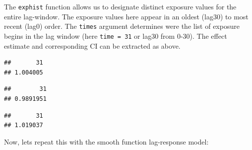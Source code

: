 \documentclass[
]{book}
\newenvironment{Shaded}{\begin{snugshade}}{\end{snugshade}}
\newcommand{\DataTypeTok}[1]{\textcolor[rgb]{0.13,0.29,0.53}{#1}}
\newcommand{\DecValTok}[1]{\textcolor[rgb]{0.00,0.00,0.81}{#1}}
\newcommand{\KeywordTok}[1]{\textcolor[rgb]{0.13,0.29,0.53}{\textbf{#1}}}
\newcommand{\NormalTok}[1]{#1}
\newcommand{\OperatorTok}[1]{\textcolor[rgb]{0.81,0.36,0.00}{\textbf{#1}}}
\begin{document}
The \texttt{exphist} function allows us to designate distinct exposure values for the entire lag-window. The exposure values here appear in an oldest (lag30) to most recent (lag0) order. The \texttt{times} argument determines were the list of exposure begins in the lag window (here \texttt{time\ =\ 31} or lag30 from 0-30). The effect estimate and corresponding CI can be extracted as above.

\begin{Shaded}
\end{Shaded}

\begin{verbatim}
##       31 
## 1.004005
\end{verbatim}

\begin{Shaded}
\end{Shaded}

\begin{verbatim}
##        31 
## 0.9891951
\end{verbatim}

\begin{Shaded}
\end{Shaded}

\begin{verbatim}
##       31 
## 1.019037
\end{verbatim}

Now, lets repeat this with the smooth function lag-response model:

\begin{Shaded}
\end{Shaded}
\end{document}

